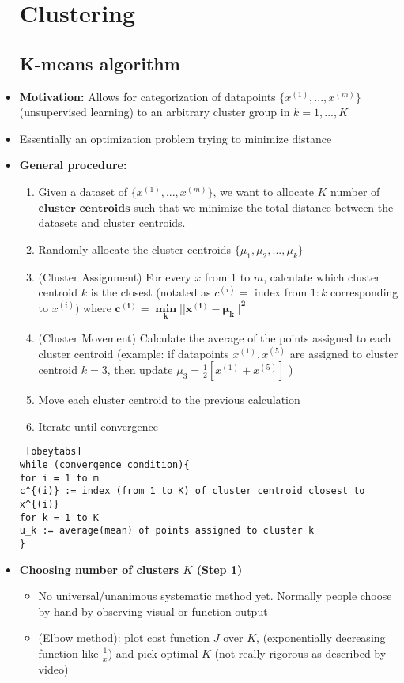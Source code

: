 \documentclass[titlepage]{article}
\begin{document}
\begin{itemize}
\section{Clustering}

\subsection{K-means algorithm}
\item \textbf{Motivation:} Allows for categorization of datapoints $\{x^{(1)},...,x^{(m)}\}$ (unsupervised learning) to an arbitrary cluster group in $k=1,...,K$
\item Essentially an optimization problem trying to minimize distance \\
\item \textbf{General procedure:}
\begin{enumerate}
	\item Given a dataset of $\{x^{(1)},...,x^{(m)}\}$, we want to allocate $K$ number of $\textbf{cluster centroids}$ such that we minimize the total distance between the datasets and cluster centroids.
	\item Randomly allocate the cluster centroids $\{\mu_1,\mu_2,...,\mu_k\}$
	\item (Cluster Assignment) For every $x$ from 1 to $m$, calculate which cluster centroid $k$ is the closest (notated as $c^{(i)} = $ index from $1:k$ corresponding to $x^{(i)}$) where $\boldsymbol{c^{(i)} = \min\limits_{k} || x^{(i)} - \mu_k ||^2}$
	\item (Cluster Movement) Calculate the average of the points assigned to each cluster centroid (example: if datapoints $x^{(1)}, x^{(5)}$ are assigned to cluster centroid $k=3$, then update $\mu_3 = \frac{1}{2} [x^{(1)} + x^{(5)}]$ )
	\item Move each cluster centroid to the previous calculation
	\item Iterate until convergence
\end{enumerate}

\begin{Verbatim} [obeytabs]
while (convergence condition){
for i = 1 to m
c^{(i)} := index (from 1 to K) of cluster centroid closest to x^{(i)}
for k = 1 to K
u_k := average(mean) of points assigned to cluster k
}
\end{Verbatim}

\item \textbf{Choosing number of clusters $K$ (Step 1)}
\begin{itemize}[label = $\bullet$]
	\item No universal/unanimous systematic method yet. Normally people choose by hand by observing visual or function output
	\item (Elbow method): plot cost function $J$ over $K$, (exponentially decreasing function like $\frac{1}{x}$) and pick optimal $K$ (not really rigorous as described by video)
\end{itemize}


\end{itemize}
\end{document}
